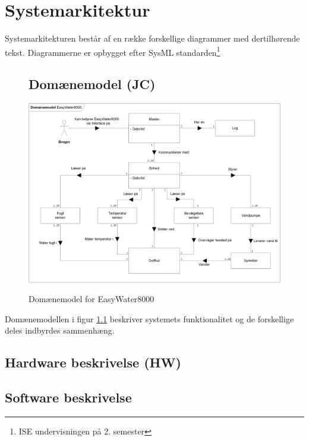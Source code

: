 \chapter{Systemarkitektur}
Systemarkitekturen består af en række forskellige diagrammer med dertilhørende tekst. Diagrammerne er opbygget efter SysML standarden\footnote{ISE undervisningen på 2. semester}

\begin{figure}[htbp] \centering
\section{Domænemodel (JC)}
{\includegraphics[width=\textwidth]{filer/systemarkitektur/Domainmodel}}
\caption{Domænemodel for EasyWater8000}
\label{lab:domainmodel}
\end{figure}
Domænemodellen i figur \ref{lab:domainmodel} beskriver systemets funktionalitet og de forskellige deles indbyrdes sammenhæng. 

\newpage
\section{Hardware beskrivelse (HW)}


\clearpage
\section{Software beskrivelse}
